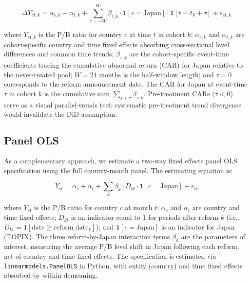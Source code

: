 \documentclass[12pt]{article}
\begin{document}
\begin{equation}
  \Delta Y_{ct,k} = \alpha_{c,k} + \alpha_{t,k} + \sum_{\tau=-W}^{W} \beta_{\tau,k} \cdot \mathbf{1}[c = \text{Japan}] \cdot \mathbf{1}[t = t_k + \tau] + \varepsilon_{ct,k}
  \label{eq:event_study}
\end{equation}

where $Y_{ct,k}$ is the P/B ratio for country $c$ at time $t$ in cohort $k$; $\alpha_{c,k}$
and $\alpha_{t,k}$ are cohort-specific country and time fixed effects absorbing cross-sectional
level differences and common time trends; $\beta_{\tau,k}$ are the cohort-specific event-time
coefficients tracing the cumulative abnormal return (CAR) for Japan relative to the never-treated
pool; $W = 24$ months is the half-window length; and $\tau = 0$ corresponds to the reform
announcement date. The CAR for Japan at event-time $\tau$ in cohort $k$ is the cumulative
sum $\sum_{s \leq \tau} \beta_{s,k}$. Pre-treatment CARs ($\tau < 0$) serve as a visual
parallel-trends test; systematic pre-treatment trend divergence would invalidate the DiD
assumption.

\subsection{Panel OLS}

As a complementary approach, we estimate a two-way fixed effects panel OLS specification
using the full country-month panel. The estimating equation is:

\begin{equation}
  Y_{ct} = \alpha_c + \alpha_t + \sum_{k} \beta_k \cdot D_{kt} \cdot \mathbf{1}[c = \text{Japan}] + \varepsilon_{ct}
  \label{eq:panel_ols}
\end{equation}

where $Y_{ct}$ is the P/B ratio for country $c$ at month $t$; $\alpha_c$ and $\alpha_t$ are
country and time fixed effects; $D_{kt}$ is an indicator equal to 1 for periods after reform
$k$ (i.e., $D_{kt} = \mathbf{1}[\text{date} \geq \text{reform\_date}_k]$); and
$\mathbf{1}[c = \text{Japan}]$ is an indicator for Japan (TOPIX). The three reform-by-Japan
interaction terms $\beta_k$ are the parameters of interest, measuring the average P/B level
shift in Japan following each reform, net of country and time fixed effects. The specification
is estimated via \texttt{linearmodels.PanelOLS} in Python, with entity (country) and time
fixed effects absorbed by within-demeaning.
\end{document}
